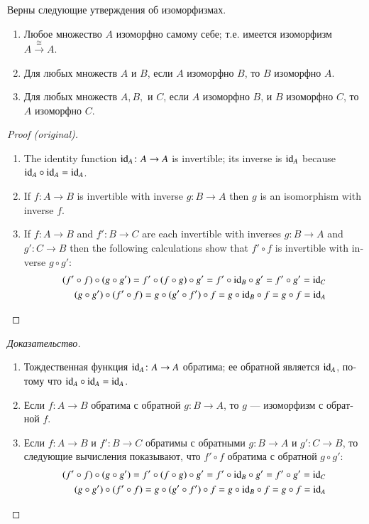 \documentclass{book}
\def\tn{\textnormal}
\def\to{\rightarrow}
\def\taking{\colon}
\def\iso{\cong}
\newcommand{\To}[1]{\xrightarrow{#1}}
\def\id{\tn{id}}
\theoremstyle{theoremENG}
\theoremstyle{lemmaENG}
\theoremstyle{propositionENG}
\theoremstyle{corollaryENG}
\theoremstyle{factENG}
\theoremstyle{remarkENG}
\theoremstyle{exampleENG}
\theoremstyle{warningENG}
\theoremstyle{questionENG}
\theoremstyle{guessENG}
\theoremstyle{answerENG}
\theoremstyle{constructionENG}
\theoremstyle{rulesENG}
\theoremstyle{excENG}
\theoremstyle{appENG}
\theoremstyle{definitionENG}
\theoremstyle{notationENG}
\theoremstyle{conjectureENG}
\theoremstyle{postulateENG}
\newenvironment{proofENG}{\begin{proof}[Proof (original)]}{\end{proof}}
\theoremstyle{theoremRUS}
\theoremstyle{lemmaRUS}
\newtheorem{lemmaRUS}[subsubsection]{\begin{russian}Лемма\end{russian}}
\theoremstyle{propositionRUS}
\theoremstyle{corollaryRUS}
\theoremstyle{factRUS}
\theoremstyle{remarkRUS}
\theoremstyle{exampleRUS}
\theoremstyle{warningRUS}
\theoremstyle{questionRUS}
\theoremstyle{guessRUS}
\theoremstyle{answerRUS}
\theoremstyle{constructionRUS}
\theoremstyle{rulesRUS}
\theoremstyle{excRUS}
\theoremstyle{appRUS}
\theoremstyle{definitionRUS}
\theoremstyle{notationRUS}
\theoremstyle{conjectureRUS}
\theoremstyle{postulateRUS}
\newenvironment{proofRUS}{\begin{proof}[Доказательство]}{\end{proof}}
\begin{document}
\begin{english}
\begin{lemmaRUS}\label{lemma:isomorphic ER in Set}
\begin{russian}
Верны следующие утверждения об изоморфизмах.
\begin{enumerate}
\item Любое множество $A$ изоморфно самому себе; т.е. имеется изоморфизм $A\To{\iso} A$.
\item Для любых множеств $A$ и $B$, если $A$ изоморфно $B$, то $B$ изоморфно $A$.
\item Для любых множеств $A, B,$ и $C$, если $A$ изоморфно $B$, и $B$ изоморфно $C$, то $A$ изоморфно $C$.
\end{enumerate}
\end{russian}
\end{lemmaRUS}

\begin{proofENG}
\begin{enumerate}
\item The identity function $\id_A\taking A\to A$ is invertible; its inverse is $\id_A$ because $\id_A\circ\id_A=\id_A$.
\item If $f\taking A\to B$ is invertible with inverse $g\taking B\to A$ then $g$ is an isomorphism with inverse $f$.
\item If $f\taking A\to B$ and $f'\taking B\to C$ are each invertible with inverses $g\taking B\to A$ and $g'\taking C\to B$ then the following calculations show that $f'\circ f$ is invertible with inverse $g\circ g'$: 
\begin{align*}
(f'\circ f)\circ(g\circ g')=f'\circ(f\circ g)\circ g'=f'\circ\id_B\circ g'=f'\circ g'=\id_C\\
(g\circ g')\circ(f'\circ f)=g\circ(g'\circ f')\circ f=g\circ\id_B\circ f=g\circ f=\id_A
\end{align*}
\end{enumerate}
\end{proofENG}

\begin{proofRUS}
\begin{russian}
\begin{enumerate}
\item Тождественная функция $\id_A\taking A\to A$ обратима; ее обратной является $\id_A$, потому что $\id_A\circ\id_A=\id_A$.
\item Если $f\taking A\to B$ обратима с обратной $g\taking B\to A$, то $g$ — изоморфизм с обратной $f$.
\item Если $f\taking A\to B$ и $f'\taking B\to C$ обратимы с обратными $g\taking B\to A$ и $g'\taking C\to B$, то следующие вычисления показывают, что $f'\circ f$ обратима с обратной $g\circ g'$: 
\begin{align*}
(f'\circ f)\circ(g\circ g')=f'\circ(f\circ g)\circ g'=f'\circ\id_B\circ g'=f'\circ g'=\id_C\\
(g\circ g')\circ(f'\circ f)=g\circ(g'\circ f')\circ f=g\circ\id_B\circ f=g\circ f=\id_A
\end{align*}
\end{enumerate}
\end{russian}
\end{proofRUS}


\end{english}
\end{document}
